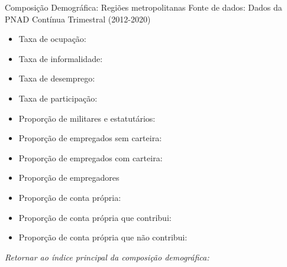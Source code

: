 \begin{frame}[label=_composicao_demografica_regiao_metro]{Composição Demográfica: Regiões metropolitanas}
{\footnotesize Fonte de dados: Dados da PNAD Contínua Trimestral (2012-2020)}
\begin{itemize}
\item{Taxa de ocupação: \hyperlink{_composicao_demografica_regiao_metro_taxa_de_ocupacao}{}}
\item{Taxa de informalidade: \hyperlink{_composicao_demografica_regiao_metro_taxa_de_informalidade}{}}
\item{Taxa de desemprego: \hyperlink{_composicao_demografica_regiao_metro_taxa_de_desemprego}{}}
\item{Taxa de participação: \hyperlink{_composicao_demografica_regiao_metro_taxa_de_participacao}{}}
\item{Proporção de militares e estatutários: \hyperlink{_composicao_demografica_regiao_metro_prop_militar}{}}
\item{Proporção de empregados sem carteira: \hyperlink{_composicao_demografica_regiao_metro_prop_empregadoSC}{}}
\item{Proporção de empregados com carteira: \hyperlink{_composicao_demografica_regiao_metro_prop_empregadoCC}{}}
\item{Proporção de empregadores \hyperlink{_composicao_demografica_regiao_metro_prop_empregador}{}}
\item{Proporção de conta própria: \hyperlink{_composicao_demografica_regiao_metro_prop_cpropria}{}}
\item{Proporção de conta própria que contribui: \hyperlink{_composicao_demografica_regiao_metro_prop_cpropriaC}{}}
\item{Proporção de conta própria que não contribui: \hyperlink{_composicao_demografica_regiao_metro_prop_cpropriaNc}{}}
\end{itemize}

\begin{small}
\textit{Retornar ao índice principal da composição demográfica: \hyperlink{_composicao_demografica}{} }
\end{small}

\end{frame}


